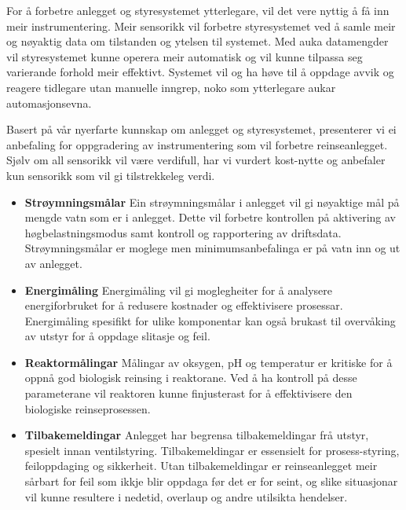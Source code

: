 For å forbetre anlegget og styresystemet ytterlegare, vil det vere nyttig å få inn meir instrumentering. 
Meir sensorikk vil forbetre styresystemet ved å samle meir og nøyaktig data om tilstanden og ytelsen til systemet. 
Med auka datamengder vil styresystemet kunne operera meir automatisk og vil kunne tilpassa seg varierande forhold meir effektivt. 
Systemet vil og ha høve til å oppdage avvik og reagere tidlegare utan manuelle inngrep, noko som ytterlegare aukar automasjonsevna.

Basert på vår nyerfarte kunnskap om anlegget og styresystemet, presenterer vi ei
anbefaling for oppgradering av instrumentering som vil forbetre reinseanlegget. 
Sjølv om all sensorikk vil være verdifull, har vi vurdert kost-nytte og anbefaler kun sensorikk som vil gi tilstrekkeleg verdi.


\begin{itemize}
    \item \textbf{Strøymningsmålar} \newline
        Ein strøymningsmålar i anlegget vil gi nøyaktige mål på mengde vatn som er i anlegget.
        Dette vil forbetre kontrollen på aktivering av høgbelastningsmodus samt kontroll og rapportering av driftsdata.
        Strøymningsmålar er moglege men minimumsanbefalinga er på vatn inn og ut av anlegget.
    \item \textbf{Energimåling} \newline
        Energimåling vil gi moglegheiter for å analysere energiforbruket for å redusere kostnader og effektivisere prosessar.
        Energimåling spesifikt for ulike komponentar kan også brukast til overvåking av utstyr for å oppdage slitasje og feil.
    \item \textbf{Reaktormålingar} \newline
        Målingar av oksygen, pH og temperatur er kritiske for å oppnå god biologisk reinsing i reaktorane.\newline
        Ved å ha kontroll på desse parameterane vil reaktoren kunne finjusterast for å effektivisere den biologiske reinseprosessen.
    \item \textbf{Tilbakemeldingar} \newline
        Anlegget har begrensa tilbakemeldingar frå utstyr, spesielt innan ventilstyring.
        Tilbakemeldingar er essensielt for prosess-styring, feiloppdaging og sikkerheit.
        Utan tilbakemeldingar er reinseanlegget meir sårbart for feil som ikkje blir oppdaga før det er for seint, 
        og slike situasjonar vil kunne resultere i nedetid, overlaup og andre utilsikta hendelser.

\end{itemize}
